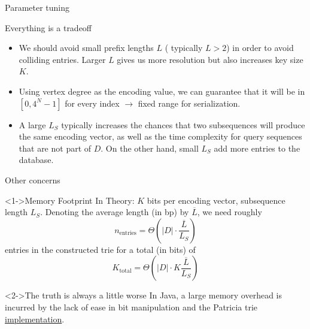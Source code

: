 \documentclass[9pt]{beamer}
\begin{document}
\begin{frame}{Parameter tuning}
	\begin{block}{Everything is a tradeoff}
		\begin{itemize}
			\item<1-> We should avoid small prefix lengths $L$ ( typically $ L > 2 $) in order to avoid colliding entries. Larger $L$ gives us more resolution but also increases key size $K$.
			\item<2-> Using vertex degree as the encoding value, we can guarantee that it will be in $[0, 4^{N} - 1] $ for every index $\to $ fixed range for serialization.
			\item<3-> A large $L_S$ typically increases the chances that two subsequences will produce the same encoding vector, as well as the time complexity for query sequences that are not part of $D$. On the other hand, small $L_S$ add more entries to the database.
		\end{itemize}
	\end{block}
\end{frame}
\begin{frame}{Other concerns}
	\begin{block}<1->{Memory Footprint}
		In Theory: $K$ bits per encoding vector, subsequence length $L_S$. Denoting the average length (in bp) by $\overline{L}$, we need roughly
		\[ n_{\text{entries}} = \Theta(|D| \cdot \frac{\overline{L}}{L_S}) \]
		entries in the constructed trie for a total (in bits) of
		\[
		   K_{\text{total}} = \Theta(|D| \cdot K \frac{\overline{L}}{L_S})
		\]
	\end{block}
	\begin{block}<2->{The truth is always a little worse}
		In Java, a large memory overhead is incurred by the lack of ease in bit manipulation and the Patricia trie \href{https://commons.apache.org/proper/commons-collections/apidocs/org/apache/commons/collections4/trie/PatriciaTrie.html}{implementation}.
	\end{block}
\end{frame}
\end{document}
